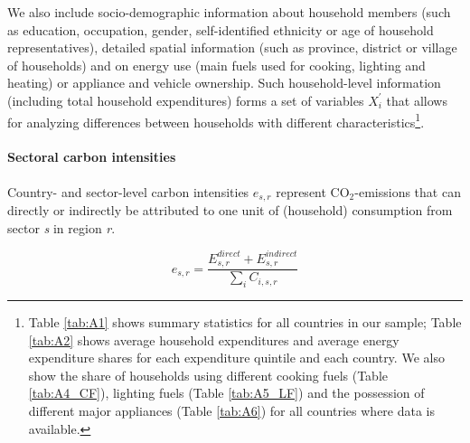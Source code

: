 \documentclass[12pt, a4paper]{article}
\begin{document}
We also include socio-demographic information about household members (such as education, occupation, gender, self-identified ethnicity or age of household representatives), detailed spatial information (such as province, district or village of households) and on energy use (main fuels used for cooking, lighting and heating) or appliance and vehicle ownership. Such household-level information (including total household expenditures) forms a set of variables $X_{i}^{'}$ that allows for analyzing differences between households with different characteristics\footnote{Table \ref{tab:A1} shows summary statistics for all countries in our sample; Table \ref{tab:A2} shows average household expenditures and average energy expenditure shares for each expenditure quintile and each country. We also show the share of households using different cooking fuels (Table \ref{tab:A4_CF}), lighting fuels (Table \ref{tab:A5_LF}) and the possession of different major appliances (Table \ref{tab:A6}) for all countries where data is available.}.


\paragraph{Sectoral carbon intensities} Country- and sector-level carbon intensities $e_{s,r}$ represent CO$_{2}$-emissions that can directly or indirectly be attributed to one unit of (household) consumption from sector \textit{s} in region \textit{r}.

\begin{equation}
    e_{s,r} = \frac{E_{s,r}^{direct}+E_{s,r}^{indirect}}{\sum_{i} C_{i,s,r}}
\end{equation}
\end{document}
